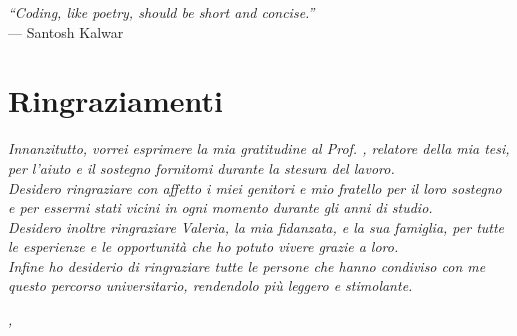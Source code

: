 \cleardoublepage
{}
{}

\begin{flushright}{
        \slshape
        ``Coding, like poetry, should be short and concise.''} \\
    \medskip
    --- Santosh Kalwar
\end{flushright}


\bigskip

\begingroup
\let\clearpage\relax
\let\cleardoublepage\relax
\let\cleardoublepage\relax

\chapter*{Ringraziamenti}

\noindent \textit{Innanzitutto, vorrei esprimere la mia gratitudine al Prof. \myProf, relatore della mia tesi, per l'aiuto e il sostegno fornitomi durante la stesura del lavoro.}\\

\noindent \textit{Desidero ringraziare con affetto i miei genitori e mio fratello per il loro
    sostegno e per essermi stati vicini in ogni momento durante gli anni di
    studio.}\\

\noindent \textit{Desidero inoltre ringraziare Valeria, la mia fidanzata, e la
    sua famiglia, per tutte le esperienze e le opportunità che ho potuto vivere
    grazie a loro.}\\

\noindent \textit{Infine ho desiderio di ringraziare tutte le persone che hanno
    condiviso con me questo percorso universitario, rendendolo più leggero e stimolante.}\\
\bigskip

\noindent\textit{\myLocation, \myTime}
\hfill \myName

\endgroup
